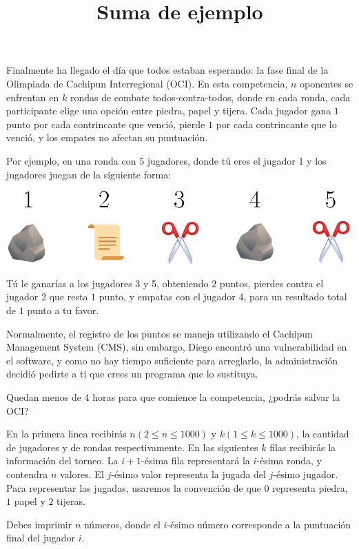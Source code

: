 \documentclass{oci}
\title{Suma de ejemplo}
\begin{document}
\begin{problemDescription}
  Finalmente ha llegado el día que todos estaban esperando: la fase final de la Olimpiada de
  Cachipun Interregional (OCI). En esta competencia, $n$ oponentes se enfrentan en $k$ rondas de combate
  todos-contra-todos, donde en cada ronda, cada participante elige una opción entre piedra, 
  papel y tijera. Cada jugador gana $1$ punto por cada contrincante que venció, pierde $1$ por cada 
  contrincante que lo venció, y los empates no afectan su puntuación.

  Por ejemplo, en una ronda con $5$ jugadores, donde tú eres el jugador 1 y los jugadores juegan de 
  la siguiente forma:

  \includegraphics{ronda.eps}

  Tú le ganarías a los jugadores 3 y 5, obteniendo $2$ puntos, pierdes contra el jugador 2 que resta $1$ 
  punto, y empatas con el jugador 4, para un resultado total de $1$ punto a tu favor.

  Normalmente, el registro de los puntos se maneja utilizando el Cachipun Management System (CMS), 
  sin embargo, Diego encontró una vulnerabilidad en el software, y como no hay tiempo suficiente 
  para arreglarlo, la administración decidió pedirte a ti que crees un programa que lo sustituya.

  Quedan menos de 4 horas para que comience la competencia, ¿podrás salvar la OCI?
\end{problemDescription}

\begin{inputDescription}
  En la primera linea recibirás $n (2 \leq n \leq 1000)$ y $k (1 \leq k \leq 1000)$, 
  la cantidad de jugadores y de rondas respectivamente. En las siguientes $k$ filas 
  recibirás la información del torneo. La $i+1$-ésima fila representará la $i$-ésima 
  ronda, y contendra $n$ valores. El $j$-ésimo valor representa la jugada del $j$-ésimo jugador.
  Para representar las jugadas, usaremos la convención de que $0$ representa piedra, $1$ papel y $2$ tijeras.
\end{inputDescription}

\begin{outputDescription}
  Debes imprimir $n$ números, donde el $i$-ésimo número corresponde a la puntuación final del jugador $i$.
\end{outputDescription}
\end{document}
